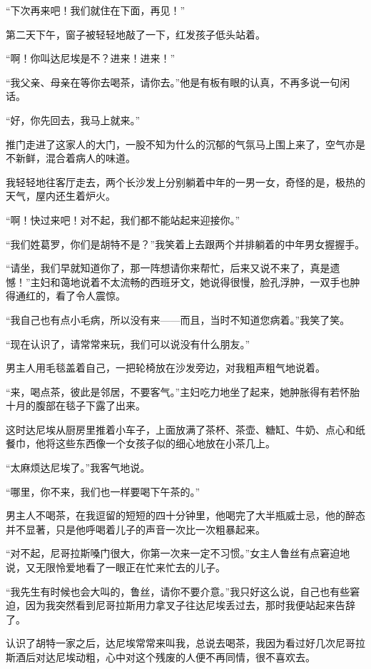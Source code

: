 \par “下次再来吧！我们就住在下面，再见！”
\par 第二天下午，窗子被轻轻地敲了一下，红发孩子低头站着。
\par “啊！你叫达尼埃是不？进来！进来！”
\par “我父亲、母亲在等你去喝茶，请你去。”他是有板有眼的认真，不再多说一句闲话。
\par “好，你先回去，我马上就来。”
\par 推门走进了这家人的大门，一股不知为什么的沉郁的气氛马上围上来了，空气亦是不新鲜，混合着病人的味道。
\par 我轻轻地往客厅走去，两个长沙发上分别躺着中年的一男一女，奇怪的是，极热的天气，屋内还生着炉火。
\par “啊！快过来吧！对不起，我们都不能站起来迎接你。”
\par “我们姓葛罗，你们是胡特不是？”我笑着上去跟两个并排躺着的中年男女握握手。
\par “请坐，我们早就知道你了，那一阵想请你来帮忙，后来又说不来了，真是遗憾！”主妇和蔼地说着不太流畅的西班牙文，她说得很慢，脸孔浮肿，一双手也肿得通红的，看了令人震惊。
\par “我自己也有点小毛病，所以没有来——而且，当时不知道您病着。”我笑了笑。
\par “现在认识了，请常常来玩，我们可以说没有什么朋友。”
\par 男主人用毛毯盖着自己，一把轮椅放在沙发旁边，对我粗声粗气地说着。
\par “来，喝点茶，彼此是邻居，不要客气。”主妇吃力地坐了起来，她肿胀得有若怀胎十月的腹部在毯子下露了出来。
\par 这时达尼埃从厨房里推着小车子，上面放满了茶杯、茶壶、糖缸、牛奶、点心和纸餐巾，他将这些东西像一个女孩子似的细心地放在小茶几上。
\par “太麻烦达尼埃了。”我客气地说。
\par “哪里，你不来，我们也一样要喝下午茶的。”
\par 男主人不喝茶，在我逗留的短短的四十分钟里，他喝完了大半瓶威士忌，他的醉态并不显著，只是他呼喝着儿子的声音一次比一次粗暴起来。
\par “对不起，尼哥拉斯嗓门很大，你第一次来一定不习惯。”女主人鲁丝有点窘迫地说，又无限怜爱地看了一眼正在忙来忙去的儿子。
\par “我先生有时候也会大叫的，鲁丝，请你不要介意。”我只好这么说，自己也有些窘迫，因为我突然看到尼哥拉斯用力拿叉子往达尼埃丢过去，那时我便站起来告辞了。
\par 认识了胡特一家之后，达尼埃常常来叫我，总说去喝茶，我因为看过好几次尼哥拉斯酒后对达尼埃动粗，心中对这个残废的人便不再同情，很不喜欢去。
